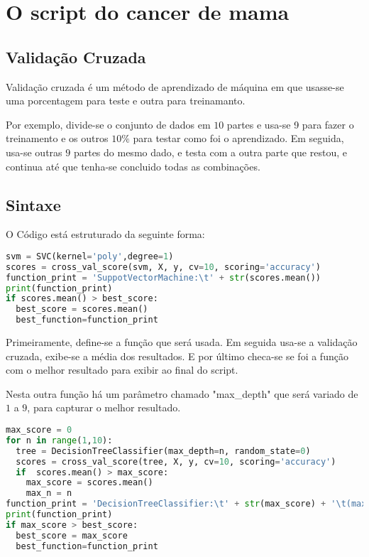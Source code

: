 \chapter{O script do cancer de mama}
\label{chapter:o_script_do_cancer_de_mama}

\section{Validação Cruzada}

Validação cruzada é um método de aprendizado de máquina em que usasse-se uma
porcentagem para teste e outra para treinamanto.

Por exemplo, divide-se o conjunto de dados em $10$ partes e usa-se 9 para fazer o
treinamento e os outros $10\%$ para testar como foi o aprendizado.
Em seguida, usa-se outras $9$ partes do mesmo dado, e testa com a outra parte
que restou, e continua até que tenha-se concluido todas as combinações.


\section{Sintaxe}
O Código está estruturado da seguinte forma:

\begin{lstlisting}[language=Python, caption=Sintaxe Simples]
svm = SVC(kernel='poly',degree=1)
scores = cross_val_score(svm, X, y, cv=10, scoring='accuracy')
function_print = 'SuppotVectorMachine:\t' + str(scores.mean())
print(function_print)
if scores.mean() > best_score:
  best_score = scores.mean()
  best_function=function_print
\end{lstlisting}

Primeiramente, define-se a função que será usada.
Em seguida usa-se a validação cruzada,
exibe-se a média dos resultados.
E por último checa-se se foi a função com o melhor resultado para exibir ao final do script.

Nesta outra função há um parâmetro chamado "max\_depth" que será variado de $1$ a $9$,
para capturar o melhor resultado.

\begin{lstlisting}[language=Python, caption=Sintaxe com Parâmetro]
max_score = 0
for n in range(1,10):
  tree = DecisionTreeClassifier(max_depth=n, random_state=0)
  scores = cross_val_score(tree, X, y, cv=10, scoring='accuracy')
  if  scores.mean() > max_score:
    max_score = scores.mean()
    max_n = n
function_print = 'DecisionTreeClassifier:\t' + str(max_score) + '\t(max_depth=' + str(max_n) + ')'
print(function_print)
if max_score > best_score:
  best_score = max_score
  best_function=function_print
\end{lstlisting}

